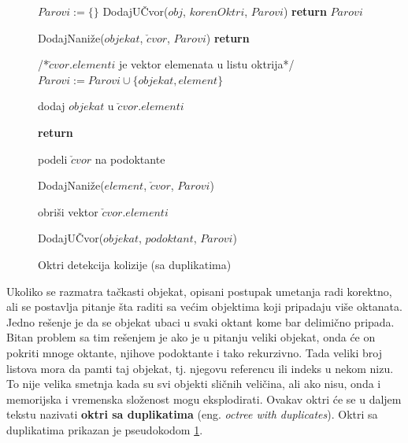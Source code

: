 \documentclass[12pt,oneside]{memoir}
\begin{document}
\begin{figure}[!h]
    \label{alg:octree}
	\begin{algorithmic}[1]
		\State $Parovi := \{ \}$
			\State DodajUČvor($obj$, $korenOktri$, $Parovi$)
		\EndFor
		\State \textbf{return} $Parovi$
		\EndProcedure

			\State DodajNaniže($objekat$, $\check{c}vor$, $Parovi$)
			\State \textbf{return}
		\EndIf		

		/*{$\check{c}vor.elementi$ je vektor elemenata u listu oktrija}*/
				\State $Parovi:=Parovi \cup \{objekat, element\}$
			\EndIf		
		\EndFor

		\State dodaj $objekat$ u $\check{c}vor.elementi$

			\State \textbf{return}
		\EndIf	

		\State podeli $\check{c}vor$ na podoktante

			\State DodajNaniže($element$, $\check{c}vor$, $Parovi$)
		\EndFor

		\State obriši vektor $\check{c}vor.elementi$

		\EndProcedure

				\State DodajUČvor($objekat$, $podoktant$, $Parovi$)
			\EndIf	
		\EndFor
		\EndProcedure
	\end{algorithmic}
	\caption{Oktri detekcija kolizije (sa duplikatima)}
\end{figure}

Ukoliko se razmatra tačkasti objekat, opisani postupak umetanja radi korektno,
ali se postavlja pitanje šta raditi sa većim objektima koji pripadaju više oktanata.
Jedno rešenje je da se objekat ubaci u svaki oktant kome bar delimično pripada.
Bitan problem sa tim rešenjem je ako je u pitanju veliki objekat, onda će on pokriti mnoge oktante, njihove 
podoktante i tako rekurzivno. 
Tada veliki broj listova mora da pamti taj objekat, tj. njegovu referencu ili indeks u nekom nizu.
To nije velika smetnja kada su svi objekti sličnih veličina, ali ako 
nisu, onda i memorijska i vremenska složenost mogu eksplodirati.
Ovakav oktri će se u daljem tekstu nazivati \textbf{oktri sa duplikatima} (eng. {\em octree with duplicates}). 
Oktri sa duplikatima prikazan je pseudokodom \ref{alg:octree}.
\end{document}

